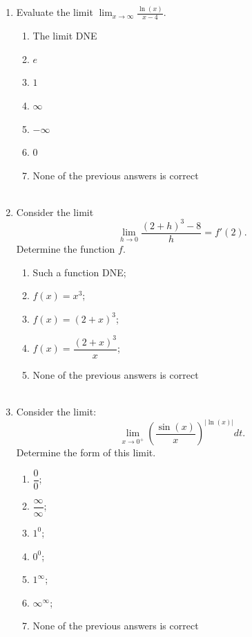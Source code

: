 \documentclass{ximera}
\begin{document}
\begin{problem}
\begin{enumerate}
      \begin{enumerate}
        \item The limit DNE
        \item $e$
        \item $1$
        \item $\infty$
        \item $-\infty$
        \item $0$
        \item None of the previous answers is correct\\ \\
      \end{enumerate}

      \item Evaluate the limit $\displaystyle \lim_{x \to \infty} \frac{\ln(x)}{x - 4}$.
        \begin{enumerate}
          \item The limit DNE
          \item $e$
          \item $1$
          \item $\infty$
          \item $-\infty$
          \item $0$
          \item None of the previous answers is correct\\ \\
        \end{enumerate} 
 
    \item Consider the limit
       \[ \lim_{h \to 0} \frac{(2+h)^3 - 8}{h} = f'(2).\]
      Determine the function $f$.
    
      \begin{enumerate}
       \item Such a function DNE;
       \item $f(x) = x^3$;
       \item $f(x) = (2 + x)^3$;
       \item $f(x) = \dfrac{(2+x)^3}{x}$;
       \item None of the previous answers is correct\\ \\
      \end{enumerate} 

    \item Consider the limit: \[ \lim_{x \to 0^+} \left( \frac{\sin(x)}{x} \right)^{|\ln(x)|}dt. \]
      Determine the form of this limit.
      \begin{enumerate}
       \item $\dfrac{0}{0}$;
       \item $\dfrac{\infty}{\infty}$;
       \item $1^0$;
       \item $0^0$;
       \item $1^\infty$;
       \item $\infty^\infty$;
       \item None of the previous answers is correct
      \end{enumerate}
       \end{enumerate}
\end{problem}
\end{document}
